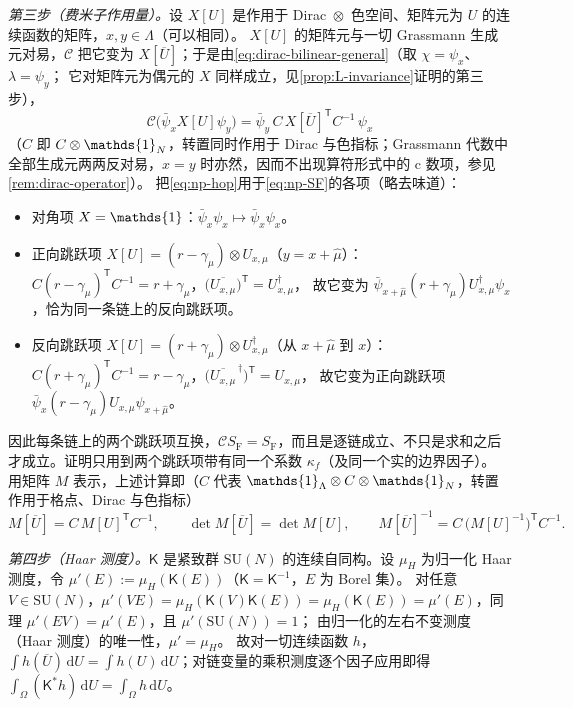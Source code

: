 \documentclass[UTF8,a4paper,11pt,fontset=fandol]{ctexart}
\makeatletter
\let\amsmathbb\mathbb
\renewcommand{\mathbb}[1]{\ifx1#1\mathds{1}\else\amsmathbb{#1}\fi}
\theoremstyle{cplain}
\theoremstyle{cdefinition}
\theoremstyle{cremark}
\renewcommand{\proofname}{证明}
\renewenvironment{proof}[1][\proofname]{\par\pushQED{\qed}\normalfont\topsep6\p@\@plus6\p@\relax
  \trivlist\item[\hskip\labelsep\itshape #1\hspace{0.5em}]\ignorespaces}{\popQED\endtrivlist\@endpefalse}
\numberwithin{equation}{section}
\newcommand{\dd}{\mathrm{d}}                         %
\newcommand{\tp}{\mathsf{T}}                         %
\newcommand{\Cop}{\mathcal{C}}                       %
\makeatother
\begin{document}
\begin{proof}
\emph{第三步（费米子作用量）。}设 $X[U]$ 是作用于 Dirac~$\otimes$~色空间、矩阵元为 $U$ 的连续函数的矩阵，$x,y\in\Lambda$（可以相同）。
$X[U]$ 的矩阵元与一切 Grassmann 生成元对易，$\Cop$ 把它变为 $X[\overline U]$；于是由\cref{eq:dirac-bilinear-general}（取 $\chi=\psi_x$、$\lambda=\psi_y$；
它对矩阵元为偶元的 $X$ 同样成立，见\cref{prop:L-invariance}证明的第三步），
\begin{equation}\label{eq:np-hop}
\Cop\bigl(\bar\psi_{x}X[U]\psi_{y}\bigr)=\bar\psi_{y}\,C\,X[\overline U]^{\tp}C^{-1}\,\psi_{x}
\end{equation}
（$C$ 即 $C\otimes\mathbb 1_N$，转置同时作用于 Dirac 与色指标；Grassmann 代数中全部生成元两两反对易，$x=y$ 时亦然，因而不出现算符形式中的 c 数项，参见\cref{rem:dirac-operator}）。
把\cref{eq:np-hop}用于\cref{eq:np-SF}的各项（略去味道）：
\begin{itemize}[leftmargin=1.6em,itemsep=1pt,topsep=2pt]
\item 对角项 $X=\mathbb 1$：$\bar\psi_x\psi_x\mapsto\bar\psi_x\psi_x$。
\item 正向跳跃项 $X[U]=(r-\gamma_\mu)\otimes U_{x,\mu}$（$y=x+\hat\mu$）：$C(r-\gamma_\mu)^{\tp}C^{-1}=r+\gamma_\mu$，$\bigl(\overline{U_{x,\mu}}\bigr)^{\tp}=U_{x,\mu}^\dagger$，
故它变为 $\bar\psi_{x+\hat\mu}(r+\gamma_\mu)U^\dagger_{x,\mu}\psi_x$，恰为同一条链上的反向跳跃项。
\item 反向跳跃项 $X[U]=(r+\gamma_\mu)\otimes U^\dagger_{x,\mu}$（从 $x+\hat\mu$ 到 $x$）：$C(r+\gamma_\mu)^{\tp}C^{-1}=r-\gamma_\mu$，$\bigl(\overline{U_{x,\mu}}^{\,\dagger}\bigr)^{\tp}=U_{x,\mu}$，
故它变为正向跳跃项 $\bar\psi_x(r-\gamma_\mu)U_{x,\mu}\psi_{x+\hat\mu}$。
\end{itemize}
因此每条链上的两个跳跃项互换，$\Cop S_{\mathrm F}=S_{\mathrm F}$，而且是逐链成立、不只是求和之后才成立。证明只用到两个跳跃项带有同一个系数 $\kappa_f$（及同一个实的边界因子）。
用矩阵 $M$ 表示，上述计算即（$C$ 代表 $\mathbb 1_\Lambda\otimes C\otimes\mathbb 1_N$，转置作用于格点、Dirac 与色指标）
\begin{equation}\label{eq:np-M}
M[\overline U]=C\,M[U]^{\tp}C^{-1},\qquad \det M[\overline U]=\det M[U],\qquad M[\overline U]^{-1}=C\,\bigl(M[U]^{-1}\bigr)^{\tp}C^{-1}.
\end{equation}

\emph{第四步（Haar 测度）。}$\mathsf K$ 是紧致群 $\mathrm{SU}(N)$ 的连续自同构。设 $\mu_H$ 为归一化 Haar 测度，令 $\mu'(E):=\mu_H(\mathsf K(E))$（$\mathsf K=\mathsf K^{-1}$，$E$ 为 Borel 集）。
对任意 $V\in\mathrm{SU}(N)$，$\mu'(VE)=\mu_H(\mathsf K(V)\mathsf K(E))=\mu_H(\mathsf K(E))=\mu'(E)$，同理 $\mu'(EV)=\mu'(E)$，且 $\mu'(\mathrm{SU}(N))=1$；
由归一化的左右不变测度（Haar 测度）的唯一性\cite{MontvayMunster1994,GattringerLang2010}，$\mu'=\mu_H$。
故对一切连续函数 $h$，$\int h(\overline U)\,\dd U=\int h(U)\,\dd U$；对链变量的乘积测度逐个因子应用即得 $\int_\Omega(\mathsf K^*h)\,\dd U=\int_\Omega h\,\dd U$。


\end{proof}
\end{document}
